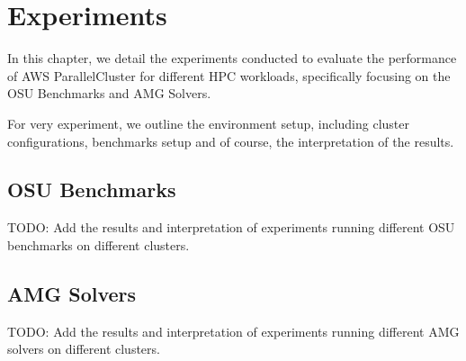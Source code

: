 

\chapter{Experiments}

In this chapter, we detail the experiments conducted to evaluate the performance of AWS ParallelCluster for different HPC workloads, specifically focusing on the OSU Benchmarks and AMG Solvers.

For very experiment, we outline the environment setup, including cluster configurations, benchmarks setup and of course, the interpretation of the results.

\section{OSU Benchmarks}

TODO: Add the results and interpretation of experiments running different OSU benchmarks on different clusters.

\section{AMG Solvers}

TODO: Add the results and interpretation of experiments running different AMG solvers on different clusters.
